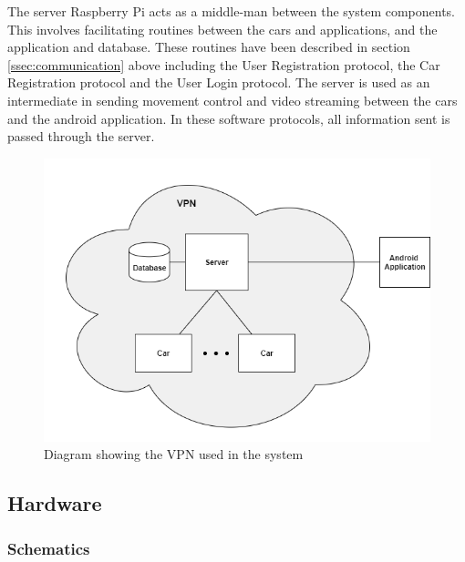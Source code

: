 \documentclass[letterpaper,12pt]{report}
\begin{document}
    The server Raspberry Pi acts as a middle-man between the system
    components. This involves facilitating routines between the cars and
    applications, and the application and database. These routines have been
    described in section \ref{ssec:communication} above including the User
    Registration protocol, the Car Registration protocol and the User Login
    protocol. The server is used as an intermediate in sending movement
    control and video streaming between the cars and the android application.
    In these software protocols, all information sent is passed through the
    server.


    \begin{figure}[H]
        \centering
        \includegraphics[width=\linewidth]{diagrams/VPN.png}
        \caption{Diagram showing the VPN used in the system}
        \label{fig:vpn}
    \end{figure}

    \subsection{Hardware}

    \subsubsection{Schematics}
\end{document}
